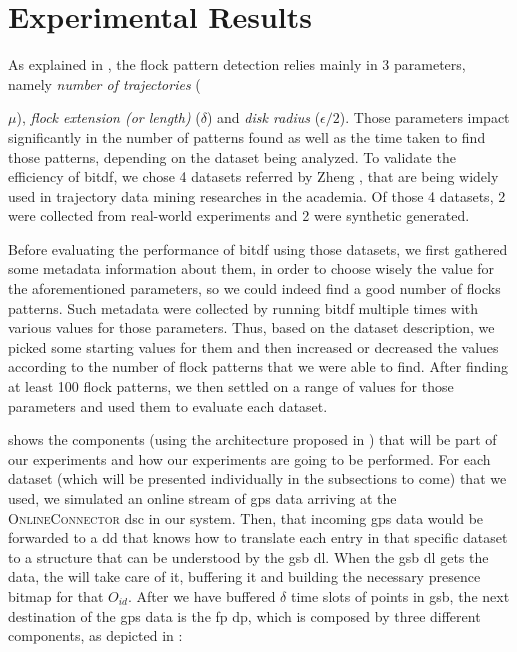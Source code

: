 \chapter{Experimental Results}
\label{chp:results}
As explained in , the flock pattern detection relies mainly in 3 parameters, namely
\textit{number of trajectories} ({$\mu$), \textit{flock extension (or length)} ($\delta$) and \textit{disk radius}
($\epsilon/2$). Those parameters impact significantly in the number of patterns found as well as the time taken to find
those patterns, depending on the dataset being analyzed. To validate the efficiency of \ac{bitdf}, we chose 4 datasets
referred by Zheng \citep{survey}, that are being widely used in trajectory data mining researches in the academia. Of
those 4 datasets, 2 were collected from real-world experiments and 2 were synthetic generated.

Before evaluating the performance of \ac{bitdf} using those datasets, we first gathered some metadata information about
them, in order to choose wisely the value for the aforementioned parameters, so we could indeed find a good number of
flocks patterns. Such metadata were collected by running \ac{bitdf} multiple times with various values for those
parameters. Thus, based on the dataset description, we picked some starting values for them and then increased or
decreased the values according to the number of flock patterns that we were able to find. After finding at least 100
flock patterns, we then settled on a range of values for those parameters and used them to evaluate each dataset.

 shows the components (using the architecture proposed in ) that
will be part of our experiments and how our experiments are going to be performed. For each dataset (which will be
presented individually in the subsections to come) that we used, we simulated an online stream of \ac{gps} data arriving
at the \textsc{OnlineConnector} \ac{dsc} in our system. Then, that incoming \ac{gps} data would be forwarded to a
\ac{dd} that knows how to translate each entry in that specific dataset to a structure that can be understood by the
\ac{gsb} \ac{dl}. When the \ac{gsb} \ac{dl} gets the data, the  will take care of it, buffering it and
building the necessary presence bitmap for that $O_{id}$. After we have buffered $\delta$ time slots of points in
\ac{gsb}, the next destination of the \ac{gps} data is the \ac{fp} \ac{dp}, which is composed by three different
components, as depicted in :

}
